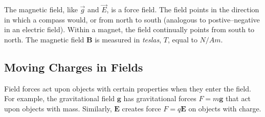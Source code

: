 \documentclass[11pt]{article}
\begin{document}
The magnetic field, like $\vec{g}$ and $\vec{E}$, is a force field. The field points in the direction in which a compass would, or from north to south (analogous to postive--negative in an electric field). Within a magnet, the field continually points from south to north. The magnetic field $\mathbf{B}$ is measured in \textit{teslas}, $T$, equal to $N/Am$.

\subsection{Moving Charges in Fields}
Field forces act upon objects with certain properties when they enter the field. For example, the gravitational field $\mathbf{g}$ has gravitational forces $F = m\mathbf{g}$ that act upon objects with mass. Similarly, $\mathbf{E}$ creates force $F = q\mathbf{E}$ on objects with charge.
\end{document}
